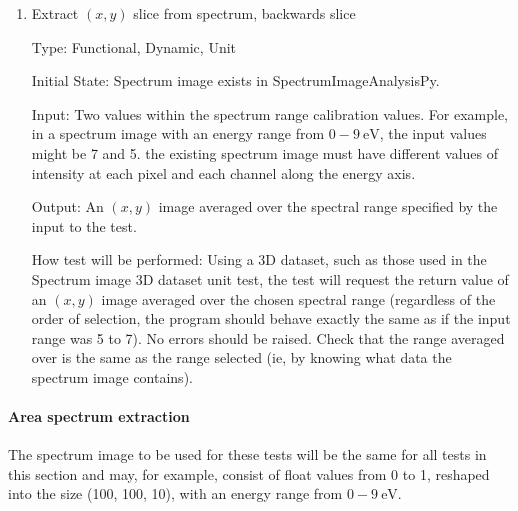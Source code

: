 \documentclass[12pt, titlepage]{article}
\newcommand{\progname}{SpectrumImageAnalysisPy}
\begin{document}
\begin{enumerate}
\item{Extract $(x,y)$ slice from spectrum, backwards slice}

Type: Functional, Dynamic, Unit

Initial State: Spectrum image exists in \progname{}.

Input: Two values within the spectrum range calibration values. For example, in
a spectrum image with an energy range from $0-9\ \si{\electronvolt}$, the input
values might be 7 and 5. the existing spectrum image must have different values
of intensity at each pixel and each channel along the energy axis.

Output: An $(x,y)$ image averaged over the spectral range specified by the input
to the test.

How test will be performed: Using a 3D dataset, such as those used in the
Spectrum image 3D dataset unit test, the test will request the return value of
an $(x,y)$ image averaged over the chosen spectral range (regardless of the
order of selection, the program should behave exactly the same as if the input
range was 5 to 7). No errors should be raised. Check that the range averaged
over is the same as the range selected (ie, by knowing what data the spectrum
image contains).

\end{enumerate}

\paragraph{Area spectrum extraction}

The spectrum image to be used for these tests will be the same for all tests in
this section and may, for example, consist of float values from 0 to 1, reshaped
into the size (100, 100, 10), with an energy range from $0-9\
\si{\electronvolt}$.
\end{document}
